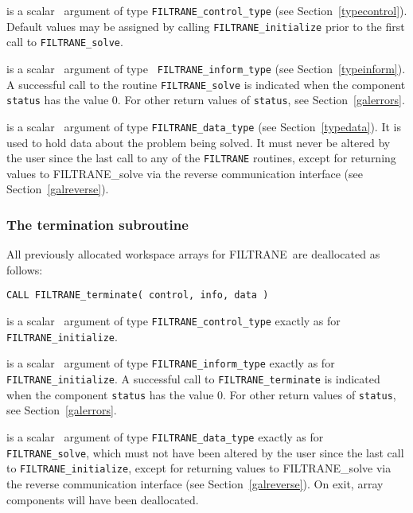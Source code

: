 \documentclass{galahad}
\newcommand{\packagename}{FILTRANE}
\begin{document}
\begin{description}
 is a scalar \intentin\ argument of type 
{\tt \packagename\_control\_type}
(see Section~\ref{typecontrol}). Default values may be assigned by calling 
{\tt \packagename\_initialize} prior to the first call to 
{\tt \packagename\_solve}.

 is a scalar \intentout\ argument of type {\tt
\packagename\_inform\_type} 
(see Section~\ref{typeinform}). A successful call to the routine
{\tt \packagename\_solve}
is indicated when the  component {\tt status} has the value 0. 
For other return values of {\tt status}, see Section~\ref{galerrors}.

 is a scalar \intentinout\ argument of type 
{\tt \packagename\_data\_type}
(see Section~\ref{typedata}). It is used to hold data about the problem being 
solved. It must never be  altered by the user since the last call to 
any of the {\tt \packagename} routines, except for returning values to
\packagename\_solve via the reverse communication interface (see
Section~\ref{galreverse}).

\end{description}


\subsubsection{The  termination subroutine}
All previously allocated workspace arrays for \packagename\ are deallocated as
follows: 
\vspace*{1mm}

\hspace{8mm}
{\tt CALL \packagename\_terminate( control, info, data )}

\begin{description}
 is a scalar \intentin\ argument of type 
{\tt \packagename\_control\_type}
exactly as for
{\tt \packagename\_initialize}.

 is a scalar \intentout\ argument of type
{\tt \packagename\_inform\_type}
exactly as for
{\tt \packagename\_initialize}.
A successful call to {\tt \packagename\_terminate}
is indicated when the component {\tt status} has the value 0. 
For other return values of {\tt status}, see Section~\ref{galerrors}.

 is a scalar \intentinout\ argument of type 
{\tt \packagename\_data\_type} 
exactly as for
{\tt \packagename\_solve},
which must not have been altered by the user since the last call to 
{\tt \packagename\_initialize}, except for returning values to
\packagename\_solve via the reverse communication interface (see
Section~\ref{galreverse}).
On exit, array components will have been deallocated.
\end{description}
\end{document}
